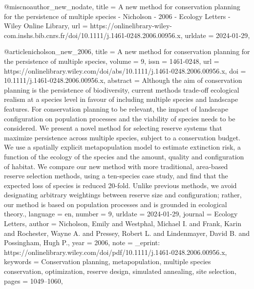 {{{@misc{noauthor_new_nodate,
	title = {A new method for conservation planning for the persistence of multiple species - {Nicholson} - 2006 - {Ecology} {Letters} - {Wiley} {Online} {Library}},
	url = {https://onlinelibrary-wiley-com.inshs.bib.cnrs.fr/doi/10.1111/j.1461-0248.2006.00956.x},
	urldate = {2024-01-29},
}

@article{nicholson_new_2006,
	title = {A new method for conservation planning for the persistence of multiple species},
	volume = {9},
	issn = {1461-0248},
	url = {https://onlinelibrary.wiley.com/doi/abs/10.1111/j.1461-0248.2006.00956.x},
	doi = {10.1111/j.1461-0248.2006.00956.x},
	abstract = {Although the aim of conservation planning is the persistence of biodiversity, current methods trade-off ecological realism at a species level in favour of including multiple species and landscape features. For conservation planning to be relevant, the impact of landscape configuration on population processes and the viability of species needs to be considered. We present a novel method for selecting reserve systems that maximize persistence across multiple species, subject to a conservation budget. We use a spatially explicit metapopulation model to estimate extinction risk, a function of the ecology of the species and the amount, quality and configuration of habitat. We compare our new method with more traditional, area-based reserve selection methods, using a ten-species case study, and find that the expected loss of species is reduced 20-fold. Unlike previous methods, we avoid designating arbitrary weightings between reserve size and configuration; rather, our method is based on population processes and is grounded in ecological theory.},
	language = {en},
	number = {9},
	urldate = {2024-01-29},
	journal = {Ecology Letters},
	author = {Nicholson, Emily and Westphal, Michael I. and Frank, Karin and Rochester, Wayne A. and Pressey, Robert L. and Lindenmayer, David B. and Possingham, Hugh P.},
	year = {2006},
	note = {\_eprint: https://onlinelibrary.wiley.com/doi/pdf/10.1111/j.1461-0248.2006.00956.x},
	keywords = {Conservation planning, metapopulation, multiple species conservation, optimization, reserve design, simulated annealing, site selection},
	pages = {1049--1060},
}

}}}
